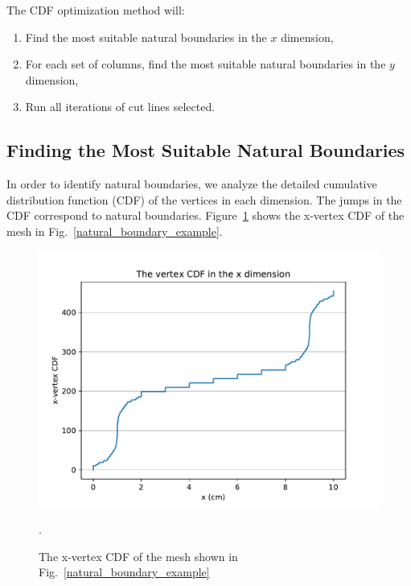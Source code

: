 The CDF optimization method will:
\begin{enumerate}
  \item Find the most suitable natural boundaries in the $x$ dimension,
  \item For each set of columns, find the most suitable natural boundaries in the $y$ dimension,
  \item Run all iterations of cut lines selected.
\end{enumerate}

\subsection{Finding the Most Suitable Natural Boundaries}

In order to identify natural boundaries, we analyze the detailed cumulative distribution function (CDF) of the vertices in each dimension. The jumps in the CDF correspond to natural boundaries. Figure~\ref{vert_cdf} shows the x-vertex CDF of the mesh in Fig.~\ref{natural_boundary_example}.
\begin{figure}[h]
\centering
\includegraphics[scale=0.75]{../figures/xvertexcdf.pdf}
\caption{The x-vertex CDF of the mesh shown in Fig.~\ref{natural_boundary_example}}.
\label{vert_cdf}
\end{figure}


